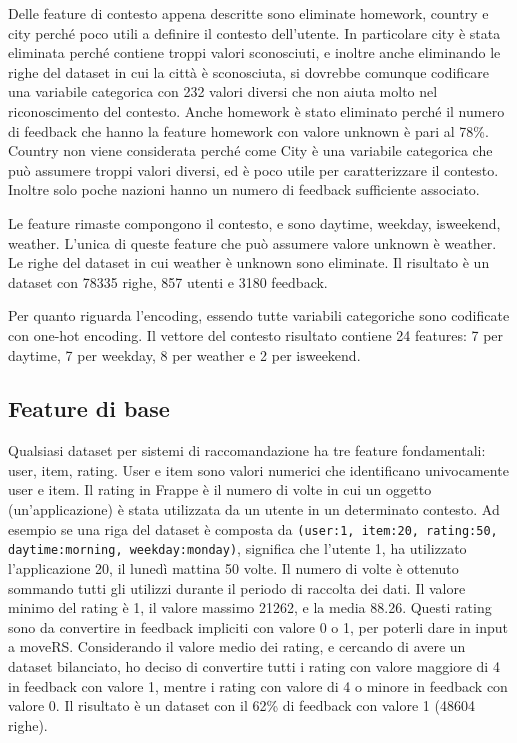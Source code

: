 \documentclass[12pt,italian]{report}
\begin{document}
\bigskip \noindent
Delle feature di contesto appena descritte sono eliminate homework, country e city perché poco utili a definire il contesto dell'utente. In particolare city è stata eliminata perché contiene troppi valori sconosciuti, e inoltre anche eliminando le righe del dataset in cui la città è sconosciuta, si dovrebbe comunque codificare una variabile categorica con 232 valori diversi che non aiuta molto nel riconoscimento del contesto. Anche homework è stato eliminato perché il numero di feedback che hanno la feature homework con valore unknown è pari al 78\%. Country non viene considerata perché come City è una variabile categorica che può assumere troppi valori diversi, ed è poco utile per caratterizzare il contesto. Inoltre solo poche nazioni hanno un numero di feedback sufficiente associato.

Le feature rimaste compongono il contesto, e sono daytime, weekday, isweekend, weather. L'unica di queste feature che può assumere valore unknown è weather. Le righe del dataset in cui weather è unknown sono eliminate. Il risultato è un dataset con 78335 righe, 857 utenti e 3180 feedback.

Per quanto riguarda l'encoding, essendo tutte variabili categoriche sono codificate con one-hot encoding. Il vettore del contesto risultato contiene 24 features: 7 per daytime, 7 per weekday, 8 per weather e 2 per isweekend.

\subsection{Feature di base}
Qualsiasi dataset per sistemi di raccomandazione ha tre feature fondamentali: user, item, rating. User e item sono valori numerici che identificano univocamente user e item. Il rating in Frappe è il numero di volte in cui un oggetto (un'applicazione) è stata utilizzata da un utente in un determinato contesto. Ad esempio se una riga del dataset è composta da \texttt{(user:1, item:20, rating:50, daytime:morning, weekday:monday)}, significa che l'utente 1, ha utilizzato l'applicazione 20, il lunedì mattina 50 volte. Il numero di volte è ottenuto sommando tutti gli utilizzi durante il periodo di raccolta dei dati. Il valore minimo del rating è 1, il valore massimo 21262, e la media 88.26. Questi rating sono da convertire in feedback impliciti con valore 0 o 1, per poterli dare in input a moveRS. Considerando il valore medio dei rating, e cercando di avere un dataset bilanciato, ho deciso di convertire tutti i rating con valore maggiore di 4 in feedback con valore 1, mentre i rating con valore di 4 o minore in feedback con valore 0. Il risultato è un dataset con il 62\% di feedback con valore 1 (48604 righe).
\end{document}

